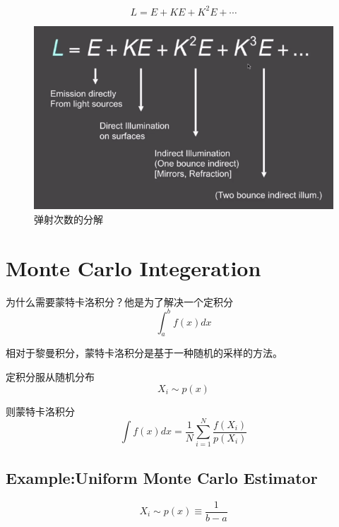 \begin{equation}
    L=E+KE+K^2E+\cdots
\end{equation}

\begin{figure}[H]
    \centering
    \includegraphics[scale=0.5]{figures/弹射次数的分解.png}
    \caption{弹射次数的分解}
\end{figure}

\section{Monte Carlo Integeration}

为什么需要蒙特卡洛积分？他是为了解决一个定积分
\begin{equation}
    \int_{a}^{b}f(x)dx
\end{equation}

相对于黎曼积分，蒙特卡洛积分是基于一种随机的采样的方法。

定积分服从随机分布
\begin{equation}
    X_i\sim p(x)
\end{equation}

则蒙特卡洛积分
\begin{equation}
    \int f(x)dx=\frac{1}{N}\sum\limits_{i=1}^{N}\frac{f(X_i)}{p(X_i)}
\end{equation}

\subsection*{Example:Uniform Monte Carlo Estimator}

\begin{equation}
    X_i\sim p(x)\equiv\frac{1}{b-a}
\end{equation}

